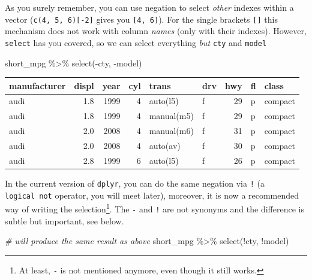 \documentclass[
]{book}
\newenvironment{Shaded}{\begin{snugshade}}{\end{snugshade}}
\newcommand{\CommentTok}[1]{\textcolor[rgb]{0.56,0.35,0.01}{\textit{#1}}}
\newcommand{\FunctionTok}[1]{\textcolor[rgb]{0.00,0.00,0.00}{#1}}
\newcommand{\NormalTok}[1]{#1}
\newcommand{\SpecialCharTok}[1]{\textcolor[rgb]{0.00,0.00,0.00}{#1}}
\begin{document}
As you surely remember, you can use negation to select \emph{other} indexes within a vector (\texttt{c(4,\ 5,\ 6){[}-2{]}} gives you \texttt{{[}4,\ 6{]}}). For the single brackets \texttt{{[}{]}} this mechanism does not work with column \emph{names} (only with their indexes). However, \texttt{select} has you covered, so we can select everything \emph{but} \texttt{cty} and \texttt{model}

\begin{Shaded}
\begin{Highlighting}[]
\NormalTok{short\_mpg }\SpecialCharTok{\%\textgreater{}\%}
  \FunctionTok{select}\NormalTok{(}\SpecialCharTok{{-}}\NormalTok{cty, }\SpecialCharTok{{-}}\NormalTok{model)}
\end{Highlighting}
\end{Shaded}

\begin{tabular}{l|r|r|r|l|l|r|l|l}
\hline
manufacturer & displ & year & cyl & trans & drv & hwy & fl & class\\
\hline
audi & 1.8 & 1999 & 4 & auto(l5) & f & 29 & p & compact\\
\hline
audi & 1.8 & 1999 & 4 & manual(m5) & f & 29 & p & compact\\
\hline
audi & 2.0 & 2008 & 4 & manual(m6) & f & 31 & p & compact\\
\hline
audi & 2.0 & 2008 & 4 & auto(av) & f & 30 & p & compact\\
\hline
audi & 2.8 & 1999 & 6 & auto(l5) & f & 26 & p & compact\\
\hline
\end{tabular}

In the current version of \texttt{dplyr}, you can do the same negation via \texttt{!} (a \texttt{logical\ not} operator, you will meet later), moreover, it is now a recommended way of writing the selection\footnote{At least, \texttt{-} is not mentioned anymore, even though it still works.}. The \texttt{-} and \texttt{!} are not synonyms and the difference is subtle but important, see below.

\begin{Shaded}
\begin{Highlighting}[]
\CommentTok{\# will produce the same result as above}
\NormalTok{short\_mpg }\SpecialCharTok{\%\textgreater{}\%}
  \FunctionTok{select}\NormalTok{(}\SpecialCharTok{!}\NormalTok{cty, }\SpecialCharTok{!}\NormalTok{model)}
\end{Highlighting}
\end{Shaded}
\end{document}
